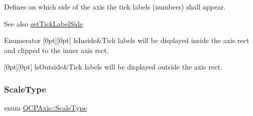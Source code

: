 Defines on which side of the axis the tick labels (numbers) shall appear.

\begin{DoxySeeAlso}{See also}
\hyperlink{classQCPAxis_a13ec644fc6e22715744c92c6dfa4f0fa}{set\+Tick\+Label\+Side} 
\end{DoxySeeAlso}
\begin{DoxyEnumFields}{Enumerator}
[0pt][0pt]{}\mbox{\label{classQCPAxis_a24b13374b9b8f75f47eed2ea78c37db9aae7b027ac2839cf4ad611df30236fc3f}} 
ls\+Inside&Tick labels will be displayed inside the axis rect and clipped to the inner axis rect. \\
\hline

[0pt][0pt]{}\mbox{\label{classQCPAxis_a24b13374b9b8f75f47eed2ea78c37db9a2eadb509fc0c9a8b35b85c86ec9f3c7a}} 
ls\+Outside&Tick labels will be displayed outside the axis rect. \\
\hline

\end{DoxyEnumFields}
\mbox{\label{classQCPAxis_a36d8e8658dbaa179bf2aeb973db2d6f0}} 
\subsubsection{\texorpdfstring{Scale\+Type}{ScaleType}}
{\footnotesize\ttfamily enum \hyperlink{classQCPAxis_a36d8e8658dbaa179bf2aeb973db2d6f0}{Q\+C\+P\+Axis\+::\+Scale\+Type}}

